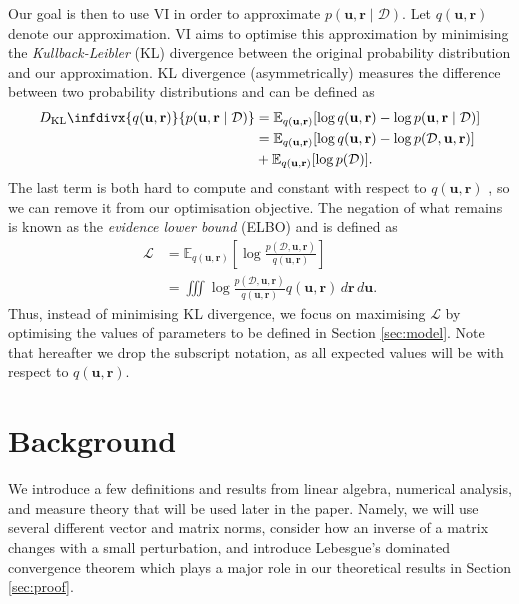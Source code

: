 \documentclass{mpaper}
\newcommand{\DKL}{D_{\mathrm{KL}}\infdivx}
\newcommand{\dx}{\,d\mathbf{r}\,d\mathbf{u}}
\newcommand{\pfull}{p(\mathcal{D}, \mathbf{u}, \mathbf{r})}
\newcommand{\approximation}{q(\mathbf{u}, \mathbf{r})}
\newcommand{\posterior}{p(\mathbf{u}, \mathbf{r} \mid \mathcal{D})}
\begin{document}
Our goal is then to use VI in order to approximate $\posterior$.
Let $\approximation$ denote our approximation. VI aims to optimise this
approximation by minimising the \emph{Kullback-Leibler} (KL) divergence between
the original probability distribution and our approximation. KL divergence
(asymmetrically) measures the difference between two probability distributions
and can be defined as \cite{blei2017variational}
\begin{align*}
  \DKL{\approximation}{\posterior} &= \mathbb{E}_{\approximation}[\log\approximation - \log\posterior ] \\
                                   &= \mathbb{E}_{\approximation}[\log\approximation - \log\pfull] \\
                                   &+ \mathbb{E}_{\approximation}[\log p(\mathcal{D})].
\end{align*}
The last term is both hard to compute and constant with respect to
$\approximation$ \cite{blei2017variational}, so we can remove it from our
optimisation objective. The negation of what remains is known as the
\emph{evidence lower bound} (ELBO) and is defined as
\cite{DBLP:books/lib/Bishop07,blei2017variational}
\begin{equation} \label{eq:elbo}
  \begin{split}
    \mathcal{L} &= \mathbb{E}_{\approximation}\left[ \log \frac{\pfull}{\approximation} \right] \\
    &= \iiint \log \frac{\pfull}{\approximation} \approximation\dx.
  \end{split}
\end{equation}
Thus, instead of minimising KL divergence, we focus on maximising $\mathcal{L}$
by optimising the values of parameters to be defined in Section \ref{sec:model}.
Note that hereafter we drop the subscript notation, as all expected values will
be with respect to $\approximation$.

\section{Background}

We introduce a few definitions and results from linear algebra, numerical
analysis, and measure theory that will be used later in the paper. Namely, we
will use several different vector and matrix norms, consider how an inverse of a
matrix changes with a small perturbation, and introduce Lebesgue's dominated
convergence theorem which plays a major role in our theoretical results in
Section \ref{sec:proof}.
\end{document}
